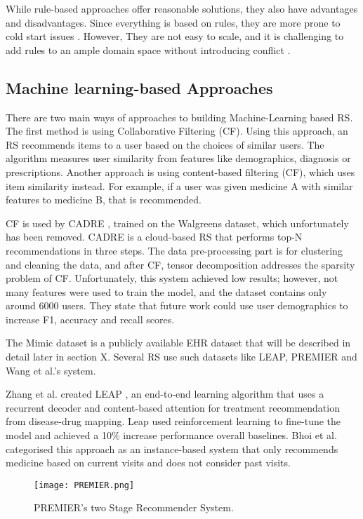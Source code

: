 While rule-based approaches offer reasonable solutions, they also have
advantages and disadvantages. Since everything is based on rules, they are
more prone to cold start issues \cite{PradeepKumarSingh2021}. However, They are
not easy to scale, and it is challenging to add rules to an ample domain space
without introducing conflict \cite{Bhoi2021}.

\subsection{
Machine learning-based Approaches
}

There are two main ways of approaches to building Machine-Learning based
RS. The first method is using Collaborative Filtering (CF). Using this
approach, an RS recommends items to a user based on the choices of similar
users. The algorithm measures user similarity from features like
demographics, diagnosis or prescriptions. Another approach is using
content-based filtering (CF), which uses item similarity instead. For
example, if a user was given medicine A with similar features to medicine
B, that is recommended. 

CF is used by CADRE \cite{Zhang2015}, trained on the Walgreens dataset, which unfortunately has been removed. CADRE is a cloud-based RS that performs top-N recommendations in three steps. The data pre-processing
part is for clustering and cleaning the data, and after CF, tensor
decomposition addresses the sparsity problem of CF. Unfortunately, this
system achieved low results; however, not many features were used to train
the model, and the dataset contains only around 6000 users. They state
that future work could use user demographics to increase F1, accuracy and
recall scores.

The Mimic dataset is a publicly available EHR dataset that will be
described in detail later in section X. Several RS use such datasets like
LEAP, PREMIER and Wang et al.'s system. 


Zhang et al. \cite{LEAP} created LEAP , an end-to-end learning algorithm that uses a
recurrent decoder and content-based attention for treatment recommendation from
disease-drug mapping. Leap used reinforcement learning to fine-tune the model
and achieved a 10\% increase performance overall baselines. Bhoi et al. 
\cite{Bhoi2021} categorised this approach as an instance-based system that
only recommends medicine based on current visits and does not consider past
visits. 

\begin{figure}
    \texttt{[image: PREMIER.png]}
    \caption{PREMIER's two Stage Recommender System.}
    \label{one}
\end{figure}

